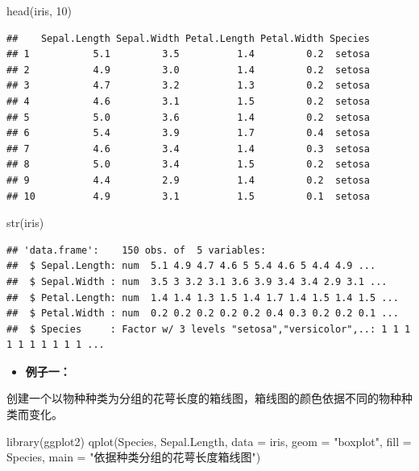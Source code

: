 \documentclass[
]{book}
\newenvironment{Shaded}{\begin{snugshade}}{\end{snugshade}}
\newcommand{\AttributeTok}[1]{\textcolor[rgb]{0.77,0.63,0.00}{#1}}
\newcommand{\DecValTok}[1]{\textcolor[rgb]{0.00,0.00,0.81}{#1}}
\newcommand{\FunctionTok}[1]{\textcolor[rgb]{0.00,0.00,0.00}{#1}}
\newcommand{\NormalTok}[1]{#1}
\newcommand{\StringTok}[1]{\textcolor[rgb]{0.31,0.60,0.02}{#1}}
\providecommand{\tightlist}{%
  \setlength{\itemsep}{0pt}\setlength{\parskip}{0pt}}
\begin{document}
\begin{Shaded}
\begin{Highlighting}[]
\FunctionTok{head}\NormalTok{(iris, }\DecValTok{10}\NormalTok{)}
\end{Highlighting}
\end{Shaded}

\begin{verbatim}
##    Sepal.Length Sepal.Width Petal.Length Petal.Width Species
## 1           5.1         3.5          1.4         0.2  setosa
## 2           4.9         3.0          1.4         0.2  setosa
## 3           4.7         3.2          1.3         0.2  setosa
## 4           4.6         3.1          1.5         0.2  setosa
## 5           5.0         3.6          1.4         0.2  setosa
## 6           5.4         3.9          1.7         0.4  setosa
## 7           4.6         3.4          1.4         0.3  setosa
## 8           5.0         3.4          1.5         0.2  setosa
## 9           4.4         2.9          1.4         0.2  setosa
## 10          4.9         3.1          1.5         0.1  setosa
\end{verbatim}

\begin{Shaded}
\begin{Highlighting}[]
\FunctionTok{str}\NormalTok{(iris)}
\end{Highlighting}
\end{Shaded}

\begin{verbatim}
## 'data.frame':    150 obs. of  5 variables:
##  $ Sepal.Length: num  5.1 4.9 4.7 4.6 5 5.4 4.6 5 4.4 4.9 ...
##  $ Sepal.Width : num  3.5 3 3.2 3.1 3.6 3.9 3.4 3.4 2.9 3.1 ...
##  $ Petal.Length: num  1.4 1.4 1.3 1.5 1.4 1.7 1.4 1.5 1.4 1.5 ...
##  $ Petal.Width : num  0.2 0.2 0.2 0.2 0.2 0.4 0.3 0.2 0.2 0.1 ...
##  $ Species     : Factor w/ 3 levels "setosa","versicolor",..: 1 1 1 1 1 1 1 1 1 1 ...
\end{verbatim}

\begin{itemize}
\tightlist
\item
  \textbf{例子一：}
\end{itemize}

创建一个以物种种类为分组的花萼长度的箱线图，箱线图的颜色依据不同的物种种类而变化。

\begin{Shaded}
\begin{Highlighting}[]
\FunctionTok{library}\NormalTok{(ggplot2)}
\FunctionTok{qplot}\NormalTok{(Species, Sepal.Length, }\AttributeTok{data =}\NormalTok{ iris, }\AttributeTok{geom =} \StringTok{"boxplot"}\NormalTok{, }\AttributeTok{fill =}\NormalTok{ Species, }\AttributeTok{main =} \StringTok{"依据种类分组的花萼长度箱线图"}\NormalTok{)}
\end{Highlighting}
\end{Shaded}
\end{document}
